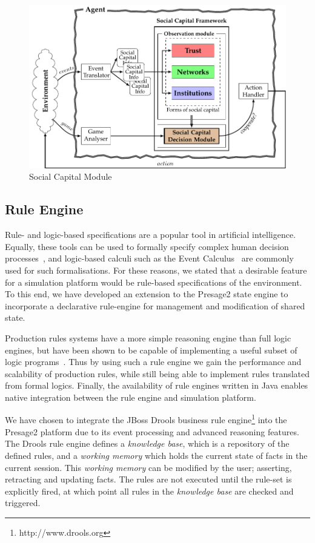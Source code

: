 \begin{figure}[htb]
\caption[Social Capital Module]{Social Capital Module~\citep{Petruzzi2014}}
\label{fig:scf}
\includegraphics[width=\linewidth]{gfx/SCF2}
\end{figure}

\subsection{Rule Engine}

Rule- and logic-based specifications are a popular tool in artificial
intelligence. Equally, these tools can be used to formally specify complex
human decision processes~\citep{Pitt2005a}, and logic-based calculi such as
the Event Calculus~\citep{Kowalski1986} are commonly used for such
formalisations. For these reasons, we stated that a desirable feature for a
simulation platform would be rule-based specifications of the environment. To
this end, we have developed an extension to the Presage2 state engine to
incorporate a declarative rule-engine for management and modification of shared
state.

Production rules systems have a more simple reasoning engine than full logic
engines, but have been shown to be capable of implementing a useful subset of
logic programs~\citep{Bragaglia2012}. Thus by using such a rule engine we gain
the performance and scalability of production rules, while still being able to
implement rules translated from formal logics. Finally, the availability of rule
engines written in Java enables native integration between the rule engine and
simulation platform.

We have chosen to integrate the JBoss Drools business rule
engine\footnote{http://www.drools.org} into the Presage2 platform due to its
event processing and advanced reasoning features. The Drools rule engine
defines a \emph{knowledge base}, which is a repository of the defined rules,
and a \emph{working memory} which holds the current state of facts in the
current session. This \emph{working memory} can be modified by the user;
asserting, retracting and updating facts. The rules are not executed until the
rule-set is explicitly fired, at which point all rules in the \emph{knowledge
base} are checked and triggered.


